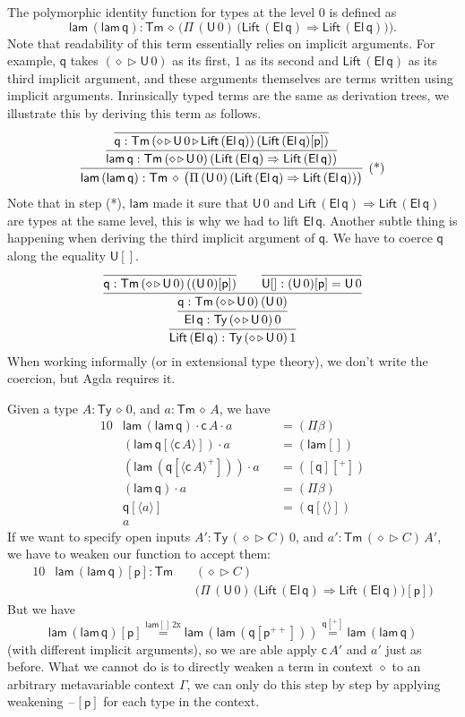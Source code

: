 \documentclass[sigplan,10pt,anonymous,review]{acmart}\settopmatter{printfolios=true,printccs=false,printacmref=false}
\newcommand{\Ra}{\Rightarrow}
\newcommand{\Ty}{\mathsf{Ty}}
\newcommand{\Tm}{\mathsf{Tm}}
\newcommand{\p}{\mathsf{p}}
\newcommand{\q}{\mathsf{q}}
\newcommand{\ext}{\mathop{\triangleright}}
\newcommand{\lam}{\mathsf{lam}}
\newcommand{\U}{\mathsf{U}}
\newcommand{\El}{\mathsf{El}}
\newcommand{\cd}{\mathsf{c}}
\newcommand{\blank}{\mathord{\hspace{1pt}\text{--}\hspace{1pt}}} %
\newcommand{\Lift}{\mathsf{Lift}}
\begin{document}
The polymorphic identity function for types at the level 0 is defined
as
\[
\lam\,(\lam\,\q) : \Tm\,\diamond\,\Big(\Pi\,(\U\,0)\,\big(\Lift\,(\El\,\q)\Ra\Lift\,(\El\,\q)\big)\Big).
\]
Note that readability of this term essentially relies on implicit
arguments. For example, $\q$ takes $(\diamond\ext\U\,0)$ as its first,
$1$ as its second and $\Lift\,(\El\,\q)$ as its third implicit
argument, and these arguments themselves are terms written using
implicit arguments. Inrinsically typed terms are the same as
derivation trees, we illustrate this by deriving this term as follows.
\[
\infer[\text{(*)}]{\lam\,(\lam\,\q) : \Tm\,\diamond\,\big(\Pi\,(\U\,0)\,(\Lift\,(\El\,\q)\Ra\Lift\,(\El\,\q))\big)}{\infer{\lam\,\q : \Tm\,(\diamond\ext\U\,0)\,(\Lift\,(\El\,\q)\Ra\Lift\,(\El\,\q))}{\infer{\q : \Tm\,(\diamond\ext\U\,0\ext\Lift\,(\El\,\q))\,(\Lift\,(\El\,\q)[\p])}{}}}
\]
Note that in step (*), $\lam$ made it sure that $\U\,0$ and
$\Lift\,(\El\,\q)\Ra\Lift\,(\El\,\q)$ are types at the same level,
this is why we had to lift $\El\,\q$. Another subtle thing is
happening when deriving the third implicit argument of $\q$. We have
to coerce $\q$ along the equality $\U[]$.
\[
\infer{\Lift\,(\El\,\q) : \Ty\,(\diamond\ext\U\,0)\,1}{\infer{\El\,\q : \Ty\,(\diamond\ext\U\,0)\,0}{\infer{\q : \Tm\,(\diamond\ext\U\,0)\,(\U\,0)}{\infer{\q : \Tm\,(\diamond\ext\U\,0)\,((\U\,0)[\p])}{} && \infer{\U[] : (\U\,0)[\p] = \U\,0}{}}}}
\]
When working informally (or in extensional type theory), we don't
write the coercion, but Agda requires it.

Given a type $A:\Ty\,\diamond\,0$, and $a : \Tm\,\diamond\,A$, we have
\begin{alignat*}{10}
  & \lam\,(\lam\,\q)\cdot\cd\,A\cdot a && {=}(\Pi\beta) \\
  & (\lam\,\q[\langle\cd\,A\rangle])\cdot a && {=}(\lam[]) \\
  & (\lam\,(\q[\langle\cd\,A\rangle^+]))\cdot a && {=}([\q][^+]) \\
  & (\lam\,\q)\cdot a && {=}(\Pi\beta) \\
  & \q[\langle a\rangle] && {=}(\q[\langle\rangle]) \\
  & a
\end{alignat*}
If we want to specify open inputs $A':\Ty\,(\diamond\ext C)\,0$, and
$a' : \Tm\,(\diamond\ext C)\,A'$, we have to weaken our function to
accept them:
\begin{alignat*}{10}
  & \lam\,(\lam\,\q)[\p] : \Tm\,&& (\diamond\ext C)\,\\
  & && \Big(\Pi\,(\U\,0)\,\big(\Lift\,(\El\,\q)\Ra\Lift\,(\El\,\q)\big)[\p]\Big)
\end{alignat*}
But we have
\[
\lam\,(\lam\,\q)[\p] \overset{\lam[]\,2\text{x}}{=} \lam\,(\lam\,(\q[\p^{++}])) \overset{\q[^+]}{=} \lam\,(\lam\,\q)
\]
(with different implicit arguments), so we are able apply $\cd\,A'$
and $a'$ just as before. What we cannot do is to directly weaken a
term in context $\diamond$ to an arbitrary metavariable context
$\Gamma$, we can only do this step by step by applying weakening
$\blank[\p]$ for each type in the context.
\end{document}
